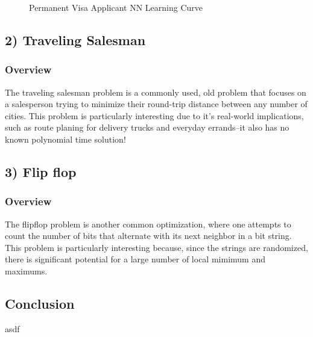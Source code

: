 \documentclass[h]{article}
\begin{document}
\begin{figure}[H]
      \caption*{Permanent Visa Applicant NN Learning Curve} 
   \endminipage\hfill
\end{figure}


\subsection*{2) Traveling Salesman}  
\subsubsection*{Overview}
The traveling salesman problem is a commonly used, old problem that focuses on a 
salesperson trying to minimize their round-trip distance between any number of cities.  This problem is particularly 
interesting  due to it's real-world implications, such as route planing for 
delivery trucks and everyday errands--it also has no known polynomial time 
solution!

\subsection*{3) Flip flop}  
\subsubsection*{Overview}
The flipflop problem is another common optimization, where one attempts to 
count the number of bits that alternate with its next neighbor in a bit string.  
This problem is particularly interesting because, since the strings are 
randomized, there is significant potential for a large number of local mimimum 
and maximums.

\subsection*{ Conclusion}  
asdf
\end{document}
